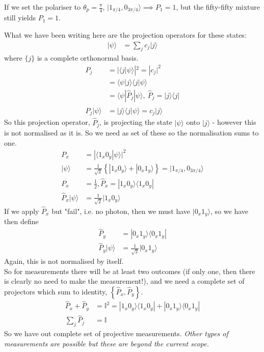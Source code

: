 \documentclass[a4paper, 11pt, normalem]{report}
\begin{document}
If we set the polariser to $\theta_p = \frac{\pi}{4}$, $|1_{\pi/4},0_{3\pi/4}\rangle \implies P_1 = 1$, but the fifty-fifty mixture still yields $P_1=1$.

What we have been writing here are the projection operators for these states:
\begin{align}
    |\psi\rangle &= \sum_jc_j|j\rangle
\end{align}
where $\{j\}$ is a complete orthonormal basis.
\begin{align}
    P_j &= |\langle j|\psi\rangle|^2 = |c_j|^2 \\
        &= \langle\psi|j\rangle\langle j|\psi\rangle \\
        &= \langle\psi|\hat{P}_j|\psi\rangle,~ \hat{P}_j = |j\rangle\langle j| \\
    \hat{P}_j|\psi\rangle &= |j\rangle\langle j|\psi\rangle = c_j|j\rangle
\end{align}
So this projection operator, $\hat{P}_j$, is projecting the state $|\psi\rangle$ onto $|j\rangle$ - however this is not normalised as it is. 
So we need as set of these so the normalisation sums to one. 
\begin{align}
    P_x &= |\langle1_x0_y|\psi\rangle|^2 \\
    |\psi\rangle &= \frac{1}{\sqrt{2}}\left\{|1_x0_y\rangle+|0_x1_y\rangle\right\} = |1_{\pi/4},0_{3\pi/4}\rangle \\
    P_x &= \frac12, \hat{P}_x = |1_x0_y\rangle\langle1_x0_y| \\
    \hat{P}_x|\psi\rangle &= \frac{1}{\sqrt{2}}|1_x0_y\rangle
\end{align}
If we apply $\hat{P}_x$ but "fail", i.e. no photon, then we must have $|0_x1_y\rangle$, so we have then define
\begin{align}
    \hat{P}_y &= |0_x1_y\rangle\langle0_x1_y| \\
    \hat{P}_y|\psi\rangle &= \frac{1}{\sqrt{2}} |0_x1_y\rangle
\end{align}
Again, this is not normalised by itself. \\
So for measurements there will be at least two outcomes (if only one, then there is clearly no need to make the measurement!), and we need a complete set of projectors which sum to identity, $\left\{\hat{P}_x,\hat{P}_y\right\}$.
\begin{align}
    \hat{P}_x+\hat{P}_y &= \mathbb{I}^2 = |1_x0_y\rangle\langle1_x0_y| + |0_x1_y\rangle\langle0_x1_y| \\
    \sum_j\hat{P}_j &= \mathbb{I}
\end{align}
So we have out complete set of projective measurements. \emph{Other types of measurements are possible but these are beyond the current scope.}
\end{document}

